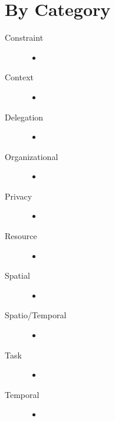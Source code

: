 \documentclass[letterpaper,10pt,english]{sphinxmanual}
\begin{document}
\section{By Category}
\label{research_questions/RQ_4:by-category}\begin{description}
\item[{Constraint}] \leavevmode\begin{itemize}
\item {} 
\end{itemize}

\item[{Context}] \leavevmode\begin{itemize}
\item {} 
\end{itemize}

\item[{Delegation}] \leavevmode\begin{itemize}
\item {} 
\end{itemize}

\item[{Organizational}] \leavevmode\begin{itemize}
\item {} 
\end{itemize}

\item[{Privacy}] \leavevmode\begin{itemize}
\item {} 
\end{itemize}

\item[{Resource}] \leavevmode\begin{itemize}
\item {} 
\end{itemize}

\item[{Spatial}] \leavevmode\begin{itemize}
\item {} 
\end{itemize}

\item[{Spatio/Temporal}] \leavevmode\begin{itemize}
\item {} 
\end{itemize}

\item[{Task}] \leavevmode\begin{itemize}
\item {} 
\end{itemize}

\item[{Temporal}] \leavevmode\begin{itemize}
\item {} 
\end{itemize}

\end{description}
\end{document}
